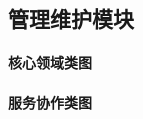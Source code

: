 \subsection{管理维护模块}

\paragraph*{核心领域类图}

\begin{center}
\resizebox{0.98\linewidth}{!}{}
\end{center}

\clearpage

\paragraph*{服务协作类图}


\begin{center}
\resizebox{0.98\linewidth}{!}{}
\end{center}



